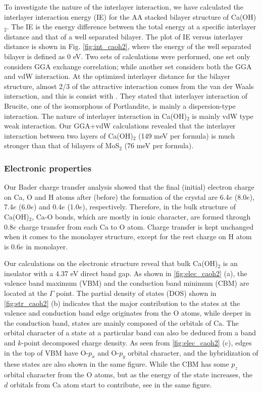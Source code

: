 To investigate the nature of the interlayer interaction, we 
have calculated the interlayer interaction energy (IE) for the AA stacked 
bilayer structure of Ca(OH)$_2$. The IE is the energy difference between the 
total energy at a specific interlayer distance and that of a well
separated bilayer. The plot of IE versus interlayer distance is shown in Fig. 
\ref{fig:int_caoh2}, where the energy of the  well separated bilayer is defined as 
0 eV. Two sets of calculations were performed, one set only considers GGA 
exchange correlation; while another set considers both the GGA and vdW 
interaction. At the optimized interlayer distance for the bilayer structure, 
almost 2/3 of the attractive interaction comes from the van der Waals 
interaction, and this is consist with \citet{DArco1993} . They stated that
interlayer interaction of Brucite, one of the isomorphous of Portlandite, is
mainly a dispersion-type interaction. The nature of interlayer interaction in Ca(OH)$_2$ is mainly vdW type weak interaction. Our GGA+vdW calculations revealed that the interlayer interaction between two layers of Ca(OH)$_2$ (149 meV per formula) is much stronger than that of bilayers of MoS$_2$ (76 meV per formula).


\subsubsection{Electronic properties}\label{sec:electronic}


Our Bader charge transfer analysis showed that the final (initial) electron 
charge on Ca, O and H atoms after (before) the formation of the crystal are 
6.4$e$ (8.0$e$), 7.4$e$ (6.0$e$) and 0.4$e$ (1.0$e$), respectively. Therefore, 
in the bulk structure of Ca(OH)$_2$, Ca-O bonds, which are 
mostly in ionic character, are formed through 0.8$e$ charge transfer 
from each Ca to O atom.  Charge transfer is kept unchanged when it comes to the monolayer structure, except for the rest charge on H atom is 0.6$e$ in monolayer.


Our calculations on the electronic structure reveal that bulk Ca(OH)$_2$ is 
an insulator with a 4.37 eV direct band gap. As shown in \autoref{fig:elec_caoh2} (a), the valence band maximum (VBM) and the conduction 
band minimum (CBM) are located at the $\Gamma$ point. The partial density of 
states (DOS) shown in \autoref{fig:str_caoh2} (b) indicates that the major 
contribution to the states at the valence and conduction band edge originates 
from the O atoms, while deeper in the conduction band, states are mainly composed 
of the orbitals of Ca. The orbital character of a state at a particular band can 
also be deduced from a band and $k$-point decomposed charge density. As seen 
from \autoref{fig:elec_caoh2} (c), edges in the top of VBM have O-$p_x$ 
and O-$p_y$ orbital character, and the hybridization of these states are also 
shown in the same figure. While the CBM has some $p_z$ orbital 
character from the O atoms, but as the energy of the state increases, the $d$ 
orbitals from Ca atom start to contribute, see  in the same figure.


